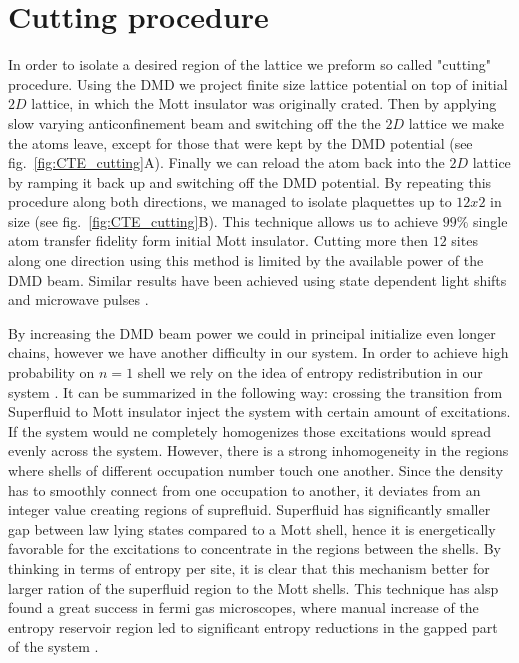 \section{Cutting procedure}

In order to isolate a desired region of the lattice we preform so called "cutting" procedure. Using the DMD we project finite size lattice potential on top of initial $2D$ lattice, in which the Mott insulator was originally crated. Then by applying slow varying anticonfinement beam and switching off the the $2D$ lattice we make the atoms leave, except for those that were kept by the DMD potential (see fig.~\ref{fig:CTE_cutting}A). Finally we can reload the atom back into the $2D$ lattice by ramping it back up and switching off the DMD potential. By repeating this procedure along both directions, we managed to isolate plaquettes up to $12x2$ in size (see fig.~\ref{fig:CTE_cutting}B). This technique allows us to achieve $99\%$ single atom transfer fidelity form initial Mott insulator. Cutting more then $12$ sites along one direction using this method is limited by the available power of the DMD beam. Similar results have been achieved using state dependent light shifts and microwave pulses \cite{Bloch single site addresing}.

By increasing the DMD beam power we could in principal initialize even longer chains, however we have another difficulty in our system. In order to achieve high probability on $n=1$ shell we rely on the idea of entropy redistribution in our system \cite{some entropy redistribution}. It can be summarized in the following way: crossing the transition from Superfluid to Mott insulator inject the system with certain amount of excitations. If the system would ne completely homogenizes those excitations would spread evenly across the system. However, there is a strong inhomogeneity in the regions where shells of different occupation number touch one another. Since the density has to smoothly connect from one occupation to another, it deviates from an integer value creating regions of suprefluid. Superfluid has significantly smaller gap between law lying states compared to a Mott shell, hence it is energetically favorable for the excitations to concentrate in the regions between the shells. By thinking in terms of entropy per site, it is clear that this mechanism better for larger ration of the superfluid region to the Mott shells. This technique has alsp found a great success in fermi gas microscopes, where manual increase of the entropy reservoir region led to significant entropy reductions in the gapped part of the system \cite{Mazurenko2017, Chiu2018}.

